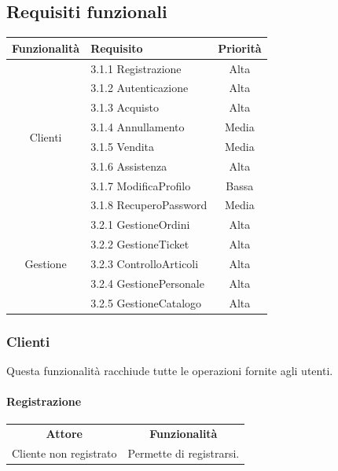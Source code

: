 \documentclass[12pt,a4paper]{article}
\begin{document}
\subsection{Requisiti funzionali}
\begin{center}
\begin{tabular}{|c|l|c|}
\hline
\rowcolor[gray]{0.8}
\textbf{Funzionalità} & \textbf{Requisito} & \textbf{Priorità} \\
\hline
\multirow{8}{*}{Clienti} & 3.1.1 Registrazione & Alta \\
& 3.1.2 Autenticazione & Alta \\
& 3.1.3 Acquisto & Alta \\
& 3.1.4 Annullamento & Media \\
& 3.1.5 Vendita & Media \\
& 3.1.6 Assistenza & Alta \\
& 3.1.7 ModificaProfilo & Bassa \\
& 3.1.8 RecuperoPassword & Media \\
\hline
\multirow{5}{*}{Gestione} & 3.2.1 GestioneOrdini & Alta \\
& 3.2.2 GestioneTicket & Alta \\
& 3.2.3 ControlloArticoli & Alta \\
& 3.2.4 GestionePersonale & Alta \\
& 3.2.5 GestioneCatalogo & Alta \\

\hline
\end{tabular}
\end{center}

\subsubsection{Clienti}
Questa funzionalità racchiude tutte le operazioni fornite agli utenti.

\paragraph*{Registrazione}
\begin{center}
\begin{tabular}{|c|c|}
\rowcolor[gray]{0.8}
\hline
\textbf{Attore} & \textbf{Funzionalità} \\
Cliente non registrato & Permette di registrarsi. \\
\hline
\end{tabular}
\end{center}
\end{document}
